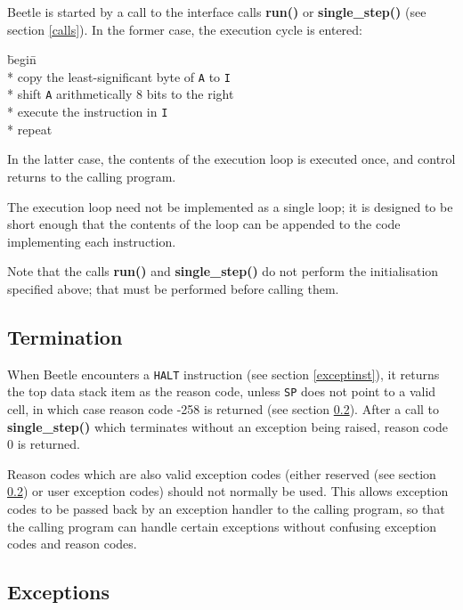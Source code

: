 Beetle is started by a call to the interface calls {\bf run()} or {\bf
single\_step()} (see section \ref{calls}). In the former case, the execution
cycle is entered:

\begin{tabbing}
\hspace{0.5in}\=begin\=\+\+ \\*
copy the least-significant byte of {\tt A} to {\tt I} \\*
shift {\tt A} arithmetically 8 bits to the right \\*
execute the instruction in {\tt I} \- \\*
repeat
\end{tabbing}

In the latter case, the contents of the execution loop is executed once, and
control returns to the calling program.

The execution loop need not be implemented as a single loop; it  is designed to
be short enough that the contents of the loop can be appended  to the code
implementing each instruction.

Note that the calls {\bf run()} and {\bf single\_step()} do not perform the
initialisation specified above; that must be performed before calling them.


\subsection{Termination}

When Beetle encounters a {\tt HALT} instruction (see section \ref{exceptinst}),
it returns the top data stack item as the reason code, unless {\tt SP} does not
point to a valid cell, in which case reason code -258 is returned (see section
\ref{exceptions}). After a call to {\bf single\_step()} which terminates without
an exception being raised, reason code 0 is returned.

Reason codes which are also valid exception codes (either reserved (see section
\ref{exceptions}) or user exception codes) should not normally be used. This
allows exception codes to be passed back by an exception handler to the calling
program, so that the calling program can handle certain exceptions without
confusing exception codes and reason codes.


\subsection{Exceptions}
\label{exceptions}

